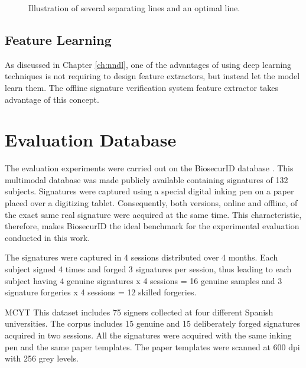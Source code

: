 \begin{figure*}[!htb]
\centering
\hspace*{0.5in} %

\caption{Illustration of several separating lines and an optimal line.} \label{fig:svm}
\end{figure*}

\subsection {Feature Learning} 
As discussed in Chapter \ref{ch:nndl}, one of the advantages of using deep learning techniques is
not requiring to design feature extractors, but instead let the model learn them. The offline signature verification system feature extractor takes advantage of this concept. 


\section{Evaluation Database}


The evaluation experiments were carried out on the BiosecurID
database \cite{biosecurid}. This multimodal database was made publicly available containing signatures of 132 subjects. Signatures were
captured using a special digital inking pen on a paper placed
over a digitizing tablet. Consequently, both versions, online and
offline, of the exact same real signature were acquired at
the same time. This characteristic, therefore, makes BiosecurID the ideal benchmark for the experimental evaluation conducted in this work.

The signatures were captured in 4 sessions
distributed over 4 months. Each subject signed 4 times and
forged 3 signatures per session, thus leading to each subject having 4 genuine signatures x 4 sessions = 16 genuine samples and 3 signature forgeries x 4 sessions = 12 skilled forgeries. 

MCYT This dataset includes 75 signers collected at four different Spanish
universities. The corpus includes 15 genuine and 15 deliberately forged signatures
acquired in two sessions. All the signatures were acquired with the same inking pen
and the same paper templates. The paper templates were scanned at 600 dpi with 256
grey levels.



